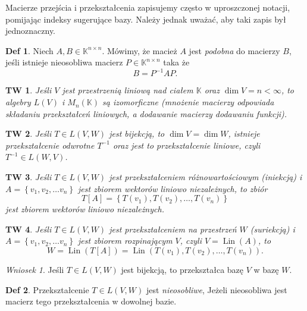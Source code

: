 \documentclass[a4paper, 12pt]{mwart}
\DeclareMathOperator{\Lin}{Lin}
\theoremstyle{definition}
\newtheorem{definicja}{Def}[section]
\theoremstyle{plain}
\newtheorem{twierdzenie}{TW}[section]
\theoremstyle{remark}
\newtheorem{wniosek}{Wniosek}[section]
\begin{document}
Macierze przejścia i przekształcenia zapisujemy często w uproszczonej notacji, pomijając indeksy sugerujące bazy. Należy jednak uważać, aby taki zapis był jednoznaczny.
\begin{definicja}
	Niech $A, B \in \mathbb{K}^{n \times n}$. Mówimy, że macież $A$ jest \emph{podobna} do macierzy $B$, jeśli istnieje nieosobliwa macierz $P \in \mathbb{K}^{n \times n}$ taka że
	\begin{equation}
		B = P^{-1} A P.
	\end{equation}
\end{definicja}
\begin{twierdzenie}
	Jeśli $V$ jest przestrzenią liniową nad ciałem $\mathbb{K}$ oraz $\dim V  = n < \infty$, to algebry $L(V)$ i $M_n(\mathbb{K})$ są izomorficzne (mnożenie macierzy odpowiada składaniu przekształceń liniowych, a dodawanie macierzy dodawaniu funkcji).
\end{twierdzenie}
\begin{twierdzenie}
	Jeśli $T \in L(V, W)$ jest bijekcją, to $\dim V = \dim W$, istnieje przekształcenie odwrotne $T^{-1}$ oraz jest to przekształcenie liniowe, czyli $T^{-1} \in L(W, V)$.
\end{twierdzenie}
\begin{twierdzenie} %
	Jeśli $T \in L(V, W)$ jest przekształceniem różnowartościowym (iniekcją) i
	$A = \left\{v_1, v_2, \ldots v_n\right\}$ jest zbiorem wektorów liniowo niezależnych, to zbiór
	\begin{equation}
		T[A] = \left\{T(v_1), T(v_2), \ldots, T(v_n)\right\}
	\end{equation}
	jest zbiorem wektorów liniowo niezależnych.
\end{twierdzenie}
\begin{twierdzenie} %
	Jeśli $T \in L(V, W)$ jest przekształceniem na przestrzeń $W$ (suriekcją) i $A = \left\{v_1, v_2, \ldots v_n\right\}$ jest zbiorem rozpinającym $V$, czyli $
	V =\Lin(A)$, to
	\begin{equation}
		W = \Lin(T[A]) = \Lin(T(v_1), T(v_2), \ldots, T(v_n)).
	\end{equation}
\end{twierdzenie}
\begin{wniosek}
	Jeśli $T \in L(V, W)$ jest bijekcją, to przekształca bazę $V$ w bazę $W$.
\end{wniosek}
\begin{definicja}
	Przekształcenie $T \in L(V, W)$ jest \emph{nieosobliwe}, Jeżeli nieosobliwa jest macierz tego przekształcenia w dowolnej bazie.
\end{definicja}
\end{document}
